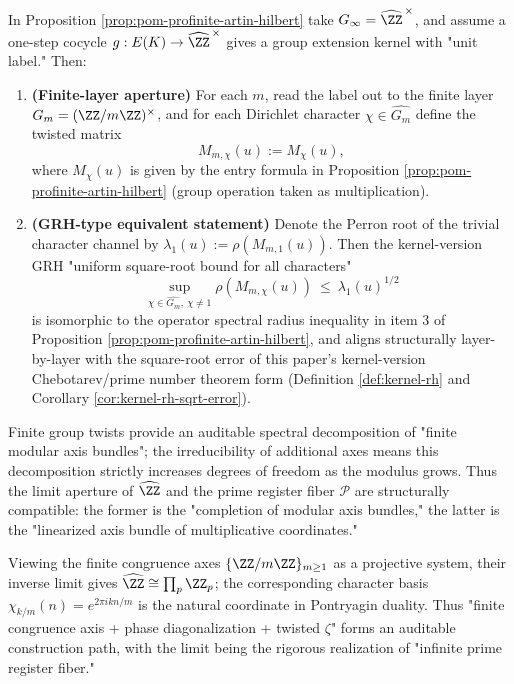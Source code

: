 \begin{corollary}\label{cor:pom-dirichlet-grh-twisted-radius}
In Proposition \ref{prop:pom-profinite-artin-hilbert} take \(G_\infty=\widehat{\ZZ}^{\,\times}\), and assume a one-step cocycle
\(
g:E(K)\to \widehat{\ZZ}^{\,\times}
\)
gives a group extension kernel with "unit label." Then:
\begin{enumerate}
  \item \textbf{(Finite-layer aperture)} For each \(m\), read the label out to the finite layer \(G_m=(\ZZ/m\ZZ)^\times\), and for each Dirichlet character \(\chi\in\widehat{G_m}\) define the twisted matrix
  \[
  M_{m,\chi}(u):=M_\chi(u),
  \]
  where \(M_\chi(u)\) is given by the entry formula in Proposition \ref{prop:pom-profinite-artin-hilbert} (group operation taken as multiplication).
  \item \textbf{(GRH-type equivalent statement)} Denote the Perron root of the trivial character channel by
  \(
  \lambda_1(u):=\rho(M_{m,1}(u))
  \).
  Then the kernel-version GRH "uniform square-root bound for all characters"
  \[
  \sup_{\chi\in\widehat{G_m},\ \chi\neq 1}\rho\!\left(M_{m,\chi}(u)\right)\ \le\ \lambda_1(u)^{1/2}
  \]
  is isomorphic to the operator spectral radius inequality in item 3 of Proposition \ref{prop:pom-profinite-artin-hilbert}, and aligns structurally layer-by-layer with the square-root error of this paper's kernel-version Chebotarev/prime number theorem form (Definition \ref{def:kernel-rh} and Corollary \ref{cor:kernel-rh-sqrt-error}).
\end{enumerate}
\end{corollary}

\begin{remark}
Finite group twists provide an auditable spectral decomposition of "finite modular axis bundles"; the irreducibility of additional axes means this decomposition strictly increases degrees of freedom as the modulus grows. Thus the limit aperture of $\widehat{\ZZ}$ and the prime register fiber $\mathcal{P}$ are structurally compatible: the former is the "completion of modular axis bundles," the latter is the "linearized axis bundle of multiplicative coordinates."
\end{remark}

\begin{remark}\label{rem:pom-congruence-invlimit}
Viewing the finite congruence axes $\{\ZZ/m\ZZ\}_{m\ge 1}$ as a projective system, their inverse limit gives
\(
\widehat{\ZZ}\cong\prod_{p}\ZZ_p
\);
the corresponding character basis
\(
\chi_{k/m}(n)=e^{2\pi i kn/m}
\)
is the natural coordinate in Pontryagin duality. Thus "finite congruence axis + phase diagonalization + twisted $\zeta$" forms an auditable construction path, with the limit being the rigorous realization of "infinite prime register fiber."
\end{remark}


